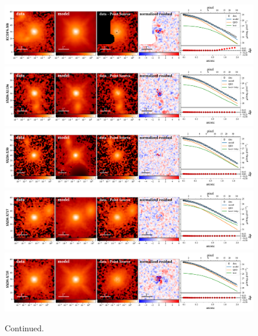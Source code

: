 \documentclass[apj]{emulateapj}
\begin{document}
\begin{figure}
\centering
{
\includegraphics[height=0.25\textwidth]{fig/best_fit_ECDFS-358_SB_profile.pdf}
\includegraphics[height=0.25\textwidth]{fig/best_fit_SXDS-X1136_SB_profile.pdf}
\includegraphics[height=0.25\textwidth]{fig/best_fit_SXDS-X50_SB_profile.pdf}
\includegraphics[height=0.25\textwidth]{fig/best_fit_SXDS-X717_SB_profile.pdf}
\includegraphics[height=0.25\textwidth]{fig/best_fit_SXDS-X735_SB_profile.pdf}
}
\caption{Continued.}
\end{figure} 
\end{document}
